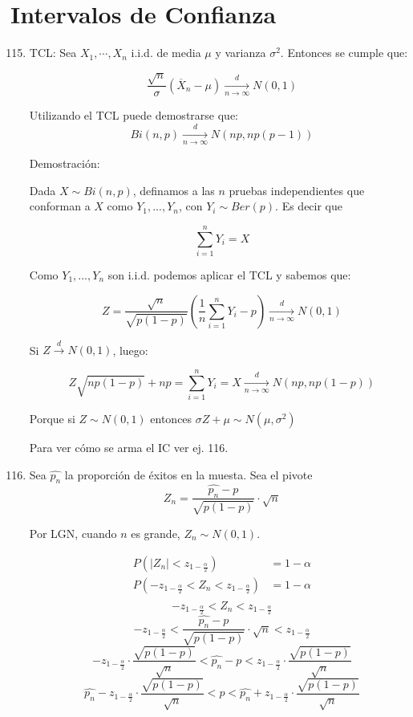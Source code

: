 \section{Intervalos de Confianza}
\begin{enumerate}
	\setcounter{enumi}{114}
	\item
		TCL: Sea $X_1, \cdots, X_n$ i.i.d. de media $\mu$ y varianza $\sigma^2$. Entonces se cumple que:

		$$\frac{\sqrt{n}}{\sigma}(\overline X_n - \mu)\xrightarrow[n\rightarrow\infty]{d} N(0,1)$$

		Utilizando el TCL puede demostrarse que:
		$$Bi(n,p)\xrightarrow[n\rightarrow\infty]{d} N(np,np(p-1))$$

		Demostración:

		Dada $X\sim Bi(n,p)$, definamos a las $n$ pruebas independientes que conforman a $X$ como $Y_1, ... , Y_n$, con $Y_i \sim Ber(p)$. Es decir que

		$$\sum_{i=1}^{n}Y_i = X$$

		Como $Y_1, ... , Y_n$ son i.i.d. podemos aplicar el TCL y sabemos que:

		$$Z = \frac{\sqrt{n}}{\sqrt{p(1-p)}}(\frac{1}{n}\sum_{i=1}^{n}Y_i - p)\xrightarrow[n\rightarrow\infty]{d} N(0,1)$$

		Si $Z \xrightarrow{d} N(0,1)$, luego:

		$$Z\sqrt{np(1-p)}+np = \sum_{i=1}^{n}Y_i = X \xrightarrow[n\rightarrow\infty]{d} N(np,np(1-p))$$

		Porque si $Z \sim N(0,1)$ entonces $\sigma Z + \mu \sim N(\mu , \sigma^2)$

		Para ver cómo se arma el IC ver ej. 116.

	\item
		Sea $\hat{p_n}$ la proporción de éxitos en la muesta.
		Sea el pivote $$Z_n = \frac{\hat{p_n} - p}{\sqrt{p(1-p)}}\cdot \sqrt{n}$$

		Por LGN, cuando $n$ es grande, $Z_n\sim N(0,1)$.

		\begin{align*}
			P(|Z_n| < z_{1-\frac{\alpha}{2}})							& = 1-\alpha	\\
			P(-z_{1-\frac{\alpha}{2}} < Z_n < z_{1-\frac{\alpha}{2}})	& = 1-\alpha	\\
		\end{align*}
		$$-z_{1-\frac{\alpha}{2}} < Z_n < z_{1-\frac{\alpha}{2}}$$
		$$-z_{1-\frac{\alpha}{2}} <  \frac{\hat{p_n} - p}{\sqrt{p(1-p)}}\cdot \sqrt{n} < z_{1-\frac{\alpha}{2}}$$
		$$-z_{1-\frac{\alpha}{2}}\cdot \frac{\sqrt{p(1-p)}}{\sqrt{n}} <  \hat{p_n} - p < z_{1-\frac{\alpha}{2}}\cdot \frac{\sqrt{p(1-p)}}{\sqrt{n}}$$
		$$\hat{p_n} - z_{1-\frac{\alpha}{2}}\cdot \frac{\sqrt{p(1-p)}}{\sqrt{n}} < p < \hat{p_n} + z_{1-\frac{\alpha}{2}}\cdot \frac{\sqrt{p(1-p)}}{\sqrt{n}}$$


\end{enumerate}
